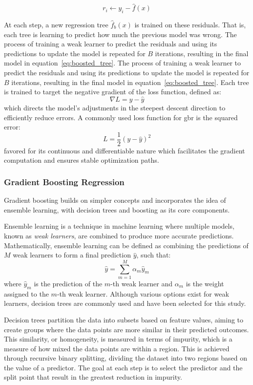$$
r_i \leftarrow y_i - \hat{f}(x)
$$

At each step, a new regression tree $\hat{f}_b(x)$ is trained on these residuals.
That is, each tree is learning to predict how much the previous model was wrong.
The process of training a weak learner to predict the residuals and using its predictions to update the model is repeated for $B$ iterations, resulting in the final model in equation~\ref{eq:boosted_tree}.
The process of training a weak learner to predict the residuals and using its predictions to update the model is repeated for $B$ iterations, resulting in the final model in equation~\ref{eq:boosted_tree}. 
Each tree is trained to target the negative gradient of the loss function, defined as:
$$
    \nabla L = y - \hat{y}
$$ 
which directs the model's adjustments in the steepest descent direction to efficiently reduce errors.
A commonly used loss function for \gls{gbr} is the squared error: 
$$ 
    L = \frac{1}{2}(y - \hat{y})^2
$$
favored for its continuous and differentiable nature which facilitates the gradient computation and ensures stable optimization paths. 



\subsubsection{Gradient Boosting Regression}\label{sec:gradientboost}
Gradient boosting builds on simpler concepts and incorporates the idea of ensemble learning, with decision trees and boosting as its core components.

Ensemble learning is a technique in machine learning where multiple models, known as \textit{weak learners}, are combined to produce more accurate predictions.
Mathematically, ensemble learning can be defined as combining the predictions of $M$ weak learners to form a final prediction $\hat{y}$, such that:
\begin{equation}
    \hat{y} = \sum_{m=1}^{M} \alpha_m \hat{y}_m
\end{equation}
where $\hat{y}_m$ is the prediction of the $m$-th weak learner and $\alpha_m$ is the weight assigned to the $m$-th weak learner.
Although various options exist for weak learners, decision trees are commonly used and have been selected for this study.

Decision trees partition the data into subsets based on feature values, aiming to create groups where the data points are more similar in their predicted outcomes. 
This similarity, or homogeneity, is measured in terms of impurity, which is a measure of how mixed the data points are within a region. 
This is achieved through recursive binary splitting, dividing the dataset into two regions based on the value of a predictor. 
The goal at each step is to select the predictor and the split point that result in the greatest reduction in impurity.

